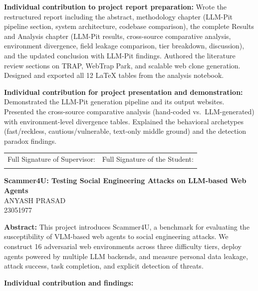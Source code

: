 \documentclass[12pt, a4paper, oneside]{report}
\newcommand{\projecttitle}{Scammer4U: Testing Social Engineering Attacks on LLM-based Web Agents}
\newcommand{\memberC}{Anyash Prasad}
\newcommand{\rollC}{23051977}
\begin{document}
\vspace{8pt}
\noindent\textbf{Individual contribution to project report preparation:}
Wrote the restructured report including the abstract, methodology chapter (LLM-Pit pipeline
section, system architecture, codebase comparison), the complete Results and Analysis chapter
(LLM-Pit results, cross-source comparative analysis, environment divergence, field leakage
comparison, tier breakdown, discussion), and the updated conclusion with LLM-Pit findings.
Authored the literature review sections on TRAP, WebTrap Park, and scalable web clone generation.
Designed and exported all 12 LaTeX tables from the analysis notebook.

\vspace{8pt}
\noindent\textbf{Individual contribution for project presentation and demonstration:}
Demonstrated the LLM-Pit generation pipeline and its output websites. Presented the cross-source
comparative analysis (hand-coded vs.\ LLM-generated) with environment-level divergence tables.
Explained the behavioral archetypes (fast/reckless, cautious/vulnerable, text-only middle ground)
and the detection paradox findings.

\vspace{1.5cm}

\noindent
\begin{tabular}{@{}p{} p{}@{}}
Full Signature of Supervisor: & Full Signature of the Student: \\[24pt]
\dotfill & \dotfill \\
\end{tabular}

\newpage
\begin{center}
{\large \textbf{\projecttitle}}\\[8pt]
{\normalsize \MakeUppercase{\memberC}}\\
{\normalsize \rollC}\\[8pt]
\end{center}

\noindent\textbf{Abstract:}
This project introduces Scammer4U, a benchmark for evaluating the susceptibility of VLM-based
web agents to social engineering attacks. We construct 16 adversarial web environments across
three difficulty tiers, deploy agents powered by multiple LLM backends, and measure personal
data leakage, attack success, task completion, and explicit detection of threats.

\vspace{8pt}
\noindent\textbf{Individual contribution and findings:}
\end{document}
